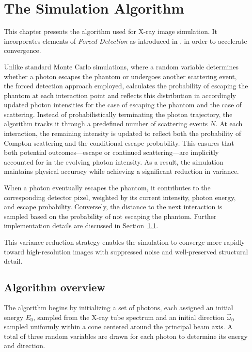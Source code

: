 \chapter{The Simulation Algorithm}
\label{Chapter5}

This chapter presents the algorithm used for X-ray image simulation. It
incorporates elements of \emph{Forced Detection} as introduced in \cite{fd2001},
in order to accelerate convergence.

Unlike standard Monte Carlo simulations, where a random variable determines
whether a photon escapes the phantom or undergoes another scattering event, the
forced detection approach employed, calculates the probability of escaping the
phantom at each interaction point and reflects this distribution in accordingly
updated photon intensities for the case of escaping the phantom and the case of
scattering. Instead of probabilistically terminating the photon trajectory, the
algorithm tracks it through a predefined number of scattering events $N$. At
each interaction, the remaining intensity is updated to reflect both the
probability of Compton scattering and the conditional escape probability. This
ensures that both potential outcomes—escape or continued scattering—are
implicitly accounted for in the evolving photon intensity. As a result, the
simulation maintains physical accuracy while achieving a significant reduction
in variance.

When a photon eventually escapes the phantom, it contributes to the
corresponding detector pixel, weighted by its current intensity, photon energy,
and escape probability. Conversely, the distance to the next interaction is
sampled based on the probability of not escaping the phantom. Further
implementation details are discussed in Section~\ref{sec:algorithmOverview}.

This variance reduction strategy enables the simulation to converge more rapidly
toward high-resolution images with suppressed noise and well-preserved
structural detail.


\section{Algorithm overview}
\label{sec:algorithmOverview}

The algorithm begins by initializing a set of photons, each assigned an initial
energy $E_0$, sampled from the X-ray tube spectrum and an initial direction
$\vec{\omega}_0$ sampled uniformly within a cone centered around the principal
beam axis. A total of three random variables are drawn for each photon to
determine its energy and direction.

